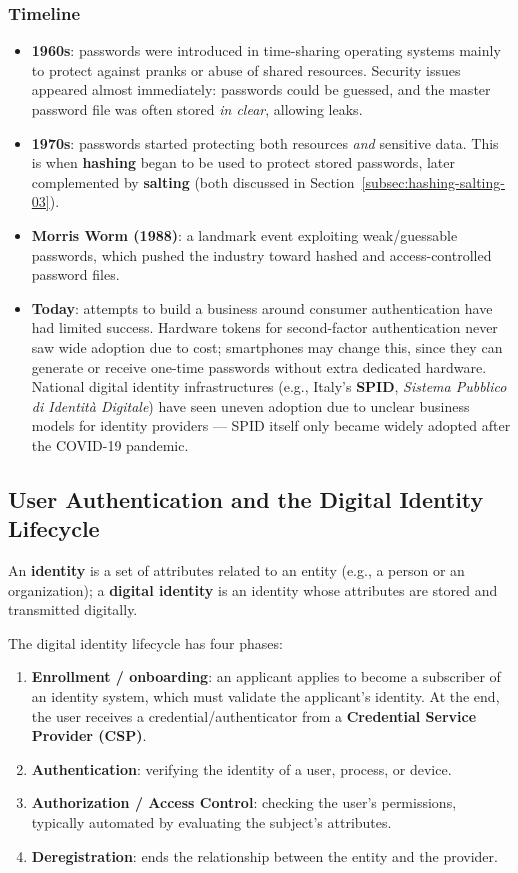 \documentclass[12pt, a4paper]{article}
\begin{document}
\subsubsection{Timeline}
\begin{itemize}
    \item \textbf{1960s}: passwords were introduced in time-sharing operating systems mainly to protect against pranks or abuse of shared resources. Security issues appeared almost immediately: passwords could be guessed, and the master password file was often stored \emph{in clear}, allowing leaks.
    \item \textbf{1970s}: passwords started protecting both resources \emph{and} sensitive data. This is when \textbf{hashing} began to be used to protect stored passwords, later complemented by \textbf{salting} (both discussed in Section~\ref{subsec:hashing-salting-03}).
    \item \textbf{Morris Worm (1988)}: a landmark event exploiting weak/guessable passwords, which pushed the industry toward hashed and access-controlled password files.
    \item \textbf{Today}: attempts to build a business around consumer authentication have had limited success. Hardware tokens for second-factor authentication never saw wide adoption due to cost; smartphones may change this, since they can generate or receive one-time passwords without extra dedicated hardware. National digital identity infrastructures (e.g., Italy's \textbf{SPID}, \emph{Sistema Pubblico di Identità Digitale}) have seen uneven adoption due to unclear business models for identity providers — SPID itself only became widely adopted after the COVID-19 pandemic.
\end{itemize}

\subsection{User Authentication and the Digital Identity Lifecycle}

An \textbf{identity} is a set of attributes related to an entity (e.g., a person or an organization); a \textbf{digital identity} is an identity whose attributes are stored and transmitted digitally.

The digital identity lifecycle has four phases:
\begin{enumerate}
    \item \textbf{Enrollment / onboarding}: an applicant applies to become a subscriber of an identity system, which must validate the applicant's identity. At the end, the user receives a credential/authenticator from a \textbf{Credential Service Provider (CSP)}.
    \item \textbf{Authentication}: verifying the identity of a user, process, or device.
    \item \textbf{Authorization / Access Control}: checking the user's permissions, typically automated by evaluating the subject's attributes.
    \item \textbf{Deregistration}: ends the relationship between the entity and the provider.
\end{enumerate}
\end{document}
